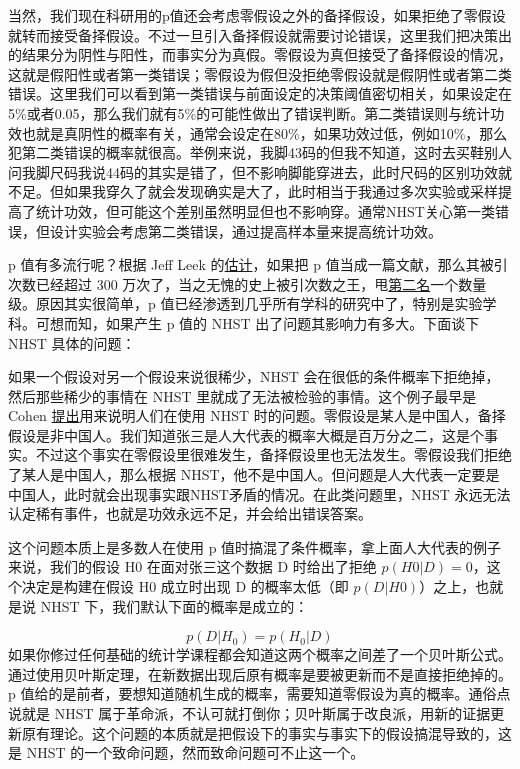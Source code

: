 \documentclass[]{tufte-book}
\begin{document}
当然，我们现在科研用的p值还会考虑零假设之外的备择假设，如果拒绝了零假设就转而接受备择假设。不过一旦引入备择假设就需要讨论错误，这里我们把决策出的结果分为阴性与阳性，而事实分为真假。零假设为真但接受了备择假设的情况，这就是假阳性或者第一类错误；零假设为假但没拒绝零假设就是假阴性或者第二类错误。这里我们可以看到第一类错误与前面设定的决策阈值密切相关，如果设定在5\%或者0.05，那么我们就有5\%的可能性做出了错误判断。第二类错误则与统计功效也就是真阴性的概率有关，通常会设定在80\%，如果功效过低，例如10\%，那么犯第二类错误的概率就很高。举例来说，我脚43码的但我不知道，这时去买鞋别人问我脚尺码我说44码的其实是错了，但不影响脚能穿进去，此时尺码的区别功效就不足。但如果我穿久了就会发现确实是大了，此时相当于我通过多次实验或采样提高了统计功效，但可能这个差别虽然明显但也不影响穿。通常NHST关心第一类错误，但设计实验会考虑第二类错误，通过提高样本量来提高统计功效。

p 值有多流行呢？根据 Jeff Leek 的\href{https://docs.google.com/presentation/d/1hzdSDaPPSE9xUYZHhOVfQIRPPdwe0A9SdE7QDsK3bOA/edit\#slide=id.g255a5ace66_3_796}{估计}，如果把 p 值当成一篇文献，那么其被引次数已经超过 300 万次了，当之无愧的史上被引次数之王，甩\href{http://www.nature.com/news/the-top-100-papers-1.16224}{第二名}一个数量级。原因其实很简单，p 值已经渗透到几乎所有学科的研究中了，特别是实验学科。可想而知，如果产生 p 值的 NHST 出了问题其影响力有多大。下面谈下 NHST 具体的问题：

如果一个假设对另一个假设来说很稀少，NHST 会在很低的条件概率下拒绝掉，然后那些稀少的事情在 NHST 里就成了无法被检验的事情。这个例子最早是 Cohen \href{http://ist-socrates.berkeley.edu/~maccoun/PP279_Cohen1.pdf}{提出}用来说明人们在使用 NHST 时的问题。零假设是某人是中国人，备择假设是非中国人。我们知道张三是人大代表的概率大概是百万分之二，这是个事实。不过这个事实在零假设里很难发生，备择假设里也无法发生。零假设我们拒绝了某人是中国人，那么根据 NHST，他不是中国人。但问题是人大代表一定要是中国人，此时就会出现事实跟NHST矛盾的情况。在此类问题里，NHST 永远无法认定稀有事件，也就是功效永远不足，并会给出错误答案。

这个问题本质上是多数人在使用 p 值时搞混了条件概率，拿上面人大代表的例子来说，我们的假设 H0 在面对张三这个数据 D 时给出了拒绝 \(p(H0|D) = 0\)，这个决定是构建在假设 H0 成立时出现 D 的概率太低（即 \(p(D|H0)\)）之上，也就是说 NHST 下，我们默认下面的概率是成立的：

\[
p(D|H_0) = p(H_0|D)
\]
如果你修过任何基础的统计学课程都会知道这两个概率之间差了一个贝叶斯公式。通过使用贝叶斯定理，在新数据出现后原有概率是要被更新而不是直接拒绝掉的。p 值给的是前者，要想知道随机生成的概率，需要知道零假设为真的概率。通俗点说就是 NHST 属于革命派，不认可就打倒你；贝叶斯属于改良派，用新的证据更新原有理论。这个问题的本质就是把假设下的事实与事实下的假设搞混导致的，这是 NHST 的一个致命问题，然而致命问题可不止这一个。
\end{document}
